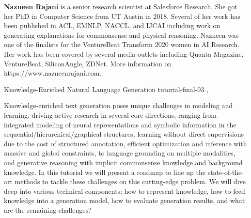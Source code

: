 \begin{bio}
  {\bfseries Nazneen Rajani} is a senior research scientist at Salesforce Research. She got her PhD in Computer Science from UT Austin in 2018. Several of her work has been published in ACL, EMNLP, NACCL, and IJCAI including work on generating explanations for commonsense and physical reasoning. Nazneen was one of the finalists for the VentureBeat Transform 2020 women in AI Research. Her work has been covered by several media outlets including Quanta Magazine, VentureBeat, SiliconAngle, ZDNet. More information on https://www.nazneenrajani.com.

\end{bio}

\begin{tutorial}
  {Knowledge-Enriched Natural Language Generation}
  {tutorial-final-03}
  {\daydateyear, \tutorialmorningtime}
  {\TutLocA}

Knowledge-enriched text generation poses unique challenges in modeling and learning, driving active research in several core directions, ranging from integrated modeling of neural representations and symbolic information in the sequential/hierarchical/graphical structures, learning without direct supervisions due to the cost of structured annotation, efficient optimization and inference with massive and global constraints, to language grounding on multiple modalities, and generative reasoning with implicit commonsense knowledge and background knowledge. In this tutorial we will present a roadmap to line up the state-of-the-art methods to tackle these challenges on this cutting-edge problem. We will dive deep into various technical components: how to represent knowledge, how to feed knowledge into a generation model, how to evaluate generation results, and what are the remaining challenges?

\end{tutorial}
